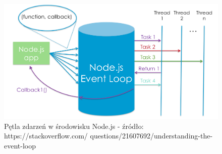 \documentclass[12pt]{report}
\begin{document}
\begin{figure}[!hb]
\centering
\includegraphics[width=\textwidth,height=\textheight,keepaspectratio]{eventLoop.png} 
\caption{Pętla zdarzeń w środowisku Node.js - źródło: https://stackoverflow.com/ questions/21607692/understanding-the-event-loop}
\end{figure}
\end{document}
